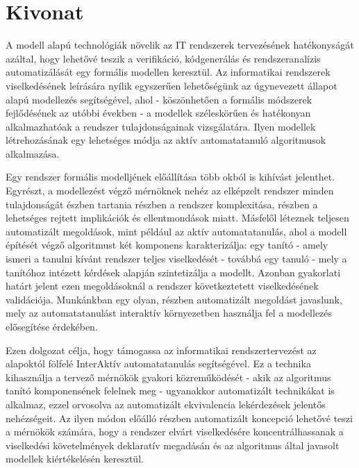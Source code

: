 \setcounter{page}{1}

\selecthungarian

\chapter*{Kivonat}

A modell alapú technológiák növelik az IT rendszerek tervezésének hatékonyságát azáltal, hogy lehetővé teszik a verifikáció, kódgenerálás és rendszeranalízis automatizálását egy formális modellen keresztül. Az informatikai rendszerek viselkedésének leírására nyílik egyszerűen lehetőségünk az úgynevezett állapot alapú modellezés segítségével, ahol - köszönhetően a formális módszerek fejlődésének az utóbbi években - a modellek széleskörűen és hatékonyan alkalmazhatóak a rendszer tulajdonságainak vizsgálatára. Ilyen modellek létrehozásának egy lehetséges módja az aktív automatatanuló algoritmusok alkalmazása.

Egy rendszer formális modelljének előállítása több okból is kihívást jelenthet. Egyrészt, a modellezést végző mérnöknek nehéz az elképzelt rendszer minden tulajdonságát észben tartania részben a rendszer komplexitása, részben a lehetséges rejtett implikációk és ellentmondások miatt. Másfelől léteznek teljesen automatizált megoldások, mint például az aktív automatatanulás, ahol a modell építését végző algoritmust két komponens karakterizálja: egy tanító - amely ismeri a tanulni kívánt rendszer teljes viselkedését - továbbá egy tanuló - mely a tanítóhoz intézett kérdések alapján szintetizálja a modellt. Azonban gyakorlati határt jelent ezen megoldásoknál a rendszer következtetett viselkedésének validációja. Munkánkban egy olyan, részben automatizált megoldást javaslunk, mely az automatatanulást interaktív környezetben használja fel a modellezés elősegítése érdekében.

Ezen dolgozat célja, hogy támogassa az informatikai rendszertervezést az alapoktól fölfelé InterAktív automatatanulás segítségével. Ez a technika kihasználja a tervező mérnökök gyakori közreműködését - akik az algoritmus tanító komponensének felelnek meg - ugyanakkor automatizált technikákat is alkalmaz, ezzel orvosolva az automatizált ekvivalencia lekérdezések jelentős nehézségeit. Az ilyen módon előálló részben automatizált koncepció lehetővé teszi a mérnökök számára, hogy a rendszer elvárt viselkedésére koncentrálhassanak a viselkedési követelmények deklaratív megadásán és az algoritmus által javasolt modellek kiértékelésén keresztül.


